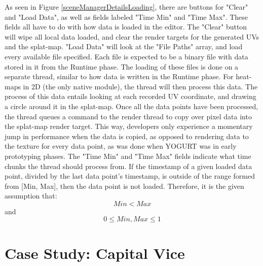 \documentclass[journal]{IEEEtran}
\begin{document}
As seen in Figure \ref{sceneManagerDetailsLoading}, there are buttons for "Clear" and "Load Data", as well as fields labeled "Time Min" and "Time Max". These fields all have to do with how data is loaded in the editor. The "Clear" button will wipe all local data loaded, and clear the render targets for the generated UVs and the splat-map. "Load Data" will look at the "File Paths" array, and load every available file specified. Each file is expected to be a binary file with data stored in it from the Runtime phase. The loading of these files is done on a separate thread, similar to how data is written in the Runtime phase. For heat-maps in 2D (the only native module), the thread will then process this data. The process of this data entails looking at each recorded UV coordinate, and drawing a circle around it in the splat-map. Once all the data points have been processed, the thread queues a command to the render thread to copy over pixel data into the splat-map render target. This way, developers only experience a momentary jump in performance when the data is copied, as opposed to rendering data to the texture for every data point, as was done when YOGURT was in early prototyping phases.
The "Time Min" and "Time Max" fields indicate what time chunks the thread should process from. If the timestamp of a given loaded data point, divided by the last data point's timestamp, is outside of the range formed from [Min, Max], then the data point is not loaded. Therefore, it is the given assumption that:
\begin{equation}
    Min < Max
\end{equation}
and
\begin{equation}
    0 \leq Min, Max \leq 1
\end{equation}


\section{Case Study: Capital Vice}
\end{document}

